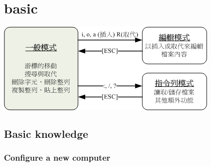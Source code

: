 \documentclass[a4paper,12pt,twoside]{book}
\begin{document}
\section{basic}

\includegraphics[scale=0.8]{pics/vi-mode} \\

\subsection{Basic knowledge}
\subsubsection{Configure a new computer}
\end{document}
